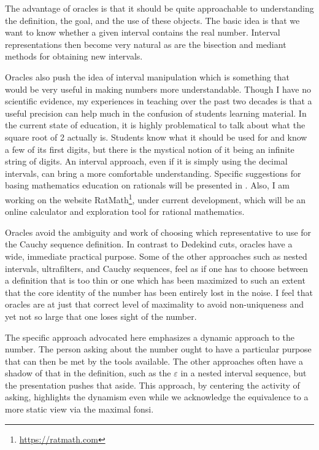 \documentclass[12pt]{article}
\begin{document}
The advantage of oracles is that it should be quite approachable to understanding the definition, the goal, and the use of these objects. The basic idea is that we want to know whether a given interval contains the real number. Interval representations then become very natural as are the bisection and mediant methods for obtaining new intervals. 

Oracles also push the idea of interval manipulation which is something that would be very useful in making numbers more understandable. Though I have no scientific evidence, my experiences in teaching over the past two decades is that a useful precision can help much in the confusion of students learning material. In the current state of education, it is highly problematical to talk about what the square root of 2 actually is. Students know what it should be used for and know a few of its first digits, but there is the mystical notion of it being an infinite string of digits. An interval approach, even if it is simply using the decimal intervals, can bring a more comfortable understanding. Specific suggestions for basing mathematics education on rationals will be presented in \cite{taylor23edu}. Also, I am working on the website RatMath\footnote{\url{https://ratmath.com}}, under current development, which will be an online calculator and exploration tool for rational mathematics. 

Oracles avoid the ambiguity and work of choosing which representative to use for the Cauchy sequence definition. In contrast to Dedekind cuts, oracles have a wide, immediate practical purpose. Some of the other approaches such as nested intervals, ultrafilters, and Cauchy sequences, feel as if one has to choose between a definition that is too thin or one which has been maximized to such an extent that the core identity of the number has been entirely lost in the noise. I feel that oracles are at just that correct level of maximality to avoid non-uniqueness and yet not so large that one loses sight of the number. 

The specific approach advocated here emphasizes a dynamic approach to the number. The person asking about the number ought to have a particular purpose that can then be met by the tools available. The other approaches often have a shadow of that in the definition, such as the $\varepsilon$ in a nested interval sequence, but the presentation pushes that aside. This approach, by centering the activity of asking, highlights the dynamism even while we acknowledge the equivalence to a more static view via the maximal fonsi.  
\end{document}
